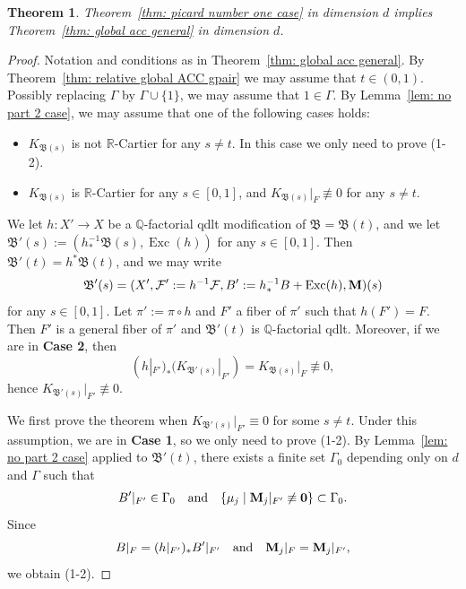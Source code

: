 \documentclass[11pt,reqno]{amsart}
\numberwithin{equation}{section}
\newcommand{\Mm}{{\bf{M}}}
\newcommand{\Exc}{\operatorname{Exc}}
\newcommand{\Bb}{{\mathfrak{B}}}
\newcommand{\Ff}{\mathcal{F}}
\newcommand{\Ii}{\Gamma}
\newtheorem{thm}{Theorem}[section]
\theoremstyle{definition}
\begin{document}
\begin{thm}\label{thm: picard one imply general global acc}
Theorem~\ref{thm: picard number one case} in dimension $d$ implies Theorem~\ref{thm: global acc general} in dimension $d$.
\end{thm}
\begin{proof}
Notation and conditions as in Theorem~\ref{thm: global acc general}. By Theorem~\ref{thm: relative global ACC gpair} we may assume that $t\in (0,1)$. Possibly replacing $\Ii$ by $\Ii\cup\{1\}$, we may assume that $1\in\Ii$. By Lemma~\ref{lem: no part 2 case}, we may assume that one of the following cases holds:
\begin{itemize}
    \item[(\textbf{Case 1})] $K_{\Bb(s)}$ is not $\mathbb R$-Cartier for any $s\neq t$. In this case we only need to prove (1-2).
    \item[(\textbf{Case 2})] $K_{\Bb(s)}$ is $\mathbb R$-Cartier for any $s\in [0,1]$, and $K_{\Bb(s)}|_F\not\equiv 0$ for any $s\neq t$.
\end{itemize}
We let $h\colon X'\rightarrow X$ be a $\mathbb Q$-factorial qdlt modification of $\Bb=\Bb(t)$, and we let $\Bb'(s):=(h^{-1}_*\Bb(s),\Exc(h))$ for any $s\in [0,1]$. Then $\Bb'(t)=h^*\Bb(t)$, and we may write 
$$\Bb'(s)=(X',\Ff':=h^{-1}\Ff,B':=h^{-1}_*B+\Exc(h),\Mm)(s)$$
for any $s\in [0,1]$. Let $\pi':=\pi\circ h$ and $F'$ a fiber of $\pi'$ such that $h(F')=F$. Then $F'$ is a general fiber of $\pi'$ and $\Bb'(t)$ is $\mathbb Q$-factorial qdlt. Moreover, if we are in \textbf{Case 2}, then
$$(h|_{F'})_*(K_{\Bb'(s)}|_{F'})=K_{\Bb(s)}|_F\not\equiv 0,$$
hence $K_{\Bb'(s)}|_{F'}\not\equiv 0$.

We first prove the theorem when $K_{\Bb'(s)}|_{F'}\equiv 0$ for some $s\neq t$. Under this assumption, we are in \textbf{Case 1}, so we only need to prove (1-2). By Lemma~\ref{lem: no part 2 case} applied to $\Bb'(t)$, there exists a finite set $\Ii_0$ depending only on $d$ and $\Ii$ such that 
$$B'|_{F'}\in\Ii_0\quad \text{and}\quad \{\mu_j\mid \Mm_j|_{F'}\not\equiv\bm{0}\}\subset\Ii_0.$$
Since 
$$B|_F=(h|_{F'})_*B'|_{F'}\quad \text{and}\quad \Mm_j|_F=\Mm_j|_{F'},$$
we obtain (1-2).


\end{proof}
\end{document}
